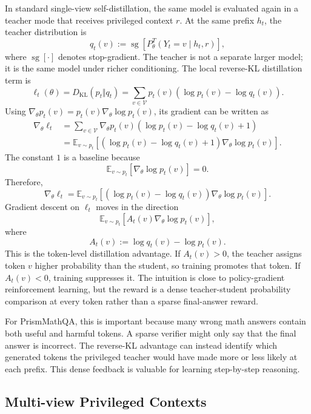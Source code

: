 In standard single-view self-distillation, the same model is evaluated again in a teacher mode that receives privileged context $r$. At the same prefix $h_t$, the teacher distribution is
\[
    q_t(v) := \operatorname{sg}\left[P_{\theta}^{T}(Y_t=v \mid h_t,r)\right],
\]
where $\operatorname{sg}[\cdot]$ denotes stop-gradient. The teacher is not a separate larger model; it is the same model under richer conditioning. The local reverse-KL distillation term is
\[
    \ell_t(\theta)=D_{\mathrm{KL}}(p_t \Vert q_t)
    = \sum_{v\in\mathcal{V}} p_t(v)\left(\log p_t(v)-\log q_t(v)\right).
\]
Using $\nabla_\theta p_t(v)=p_t(v)\nabla_\theta\log p_t(v)$, its gradient can be written as
\[
\begin{aligned}
    \nabla_\theta \ell_t
    &= \sum_{v\in\mathcal{V}} \nabla_\theta p_t(v)
       \left(\log p_t(v)-\log q_t(v)+1\right)\\
    &= \mathbb{E}_{v\sim p_t}
       \left[\left(\log p_t(v)-\log q_t(v)+1\right)
       \nabla_\theta\log p_t(v)\right].
\end{aligned}
\]
The constant $1$ is a baseline because
\[
    \mathbb{E}_{v\sim p_t}[\nabla_\theta\log p_t(v)] = 0.
\]
Therefore,
\[
    \nabla_\theta \ell_t
    = \mathbb{E}_{v\sim p_t}
       \left[\left(\log p_t(v)-\log q_t(v)\right)
       \nabla_\theta\log p_t(v)\right].
\]
Gradient descent on $\ell_t$ moves in the direction
\[
    \mathbb{E}_{v\sim p_t}\left[A_t(v)\nabla_\theta\log p_t(v)\right],
\]
where
\[
    A_t(v) := \log q_t(v)-\log p_t(v).
    \label{eq:single-advantage}
\]
This is the token-level distillation advantage. If $A_t(v)>0$, the teacher assigns token $v$ higher probability than the student, so training promotes that token. If $A_t(v)<0$, training suppresses it. The intuition is close to policy-gradient reinforcement learning, but the reward is a dense teacher-student probability comparison at every token rather than a sparse final-answer reward.

For PrismMathQA, this is important because many wrong math answers contain both useful and harmful tokens. A sparse verifier might only say that the final answer is incorrect. The reverse-KL advantage can instead identify which generated tokens the privileged teacher would have made more or less likely at each prefix. This dense feedback is valuable for learning step-by-step reasoning.

\subsection{Multi-view Privileged Contexts}

